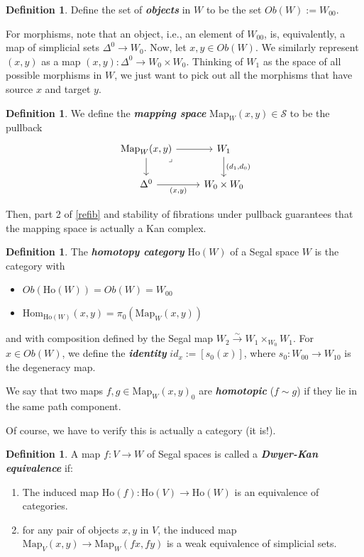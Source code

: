 \documentclass{article}
\newcommand{\textbi}[1]{\textbf{\textit{#1}}}
\newcommand{\cS}{\mathcal{S}}
\newcommand{\Ho}{\mathrm{Ho}}
\newcommand{\Hom}{\mathrm{Hom}}
\newcommand{\Map}{\mathrm{Map}}
\theoremstyle{definition}
\newtheorem{defin}[subsection]{Definition}
\begin{document}
\begin{defin}
    Define the set of \textbi{objects} in $W$ to be the set $Ob(W):=W_{00}$.
\end{defin}

For morphisms, note that an object, i.e., an element of $W_{00}$, is, equivalently, a map of simplicial sets $\Delta^0\to W_0$. Now, let $x,y \in Ob(W)$. We similarly represent $(x,y)$ as a map $(x,y):\Delta^0\to W_0\times W_0$. Thinking of $W_1$ as the space of all possible morphisms in $W$, we just want to pick out all the morphisms that have source $x$ and target $y$. 

\begin{defin}
    We define the \textbi{mapping space} $\Map_W(x,y)\in \cS$ to be the pullback 
\[\begin{tikzcd}
	{\Map_W(x,y)} & {W_1} \\
	{\Delta^0} & {W_0\times W_0}
	\arrow[from=1-1, to=1-2]
	\arrow["{(d_1, d_0)}", from=1-2, to=2-2]
	\arrow[from=1-1, to=2-1]
	\arrow["{(x,y)}"', from=2-1, to=2-2]
	\arrow["\lrcorner"{anchor=center, pos=0.125}, draw=none, from=1-1, to=2-2]
\end{tikzcd}\]
\end{defin}

Then, part 2 of \ref{refib} and stability of fibrations under pullback guarantees that the mapping space is actually a Kan complex. 

\begin{defin}
    The \textbi{homotopy category} $\Ho(W)$ of a Segal space $W$ is the category with 
    \begin{itemize}
        \item $Ob(\Ho(W))=Ob(W)=W_{00}$
        \item $\Hom_{\Ho(W)}(x,y)=\pi_0(\Map_W(x,y))$
    \end{itemize}
    and with composition defined by the Segal map $W_2\xrightarrow{\sim} W_1\times_{W_0}W_1$. For $x\in Ob(W)$, we define the \textbi{identity} $id_x:=[s_0(x)]$, where $s_0:W_{00}\to W_{10}$ is the degeneracy map.
    \par We say that two maps $f,g\in \Map_W(x,y)_0$ are \textbi{homotopic} ($f\sim g$) if they lie in the same path component. 
\end{defin}

Of course, we have to verify this is actually a category (it is!).

\begin{defin}
    A map $f: V \to W$ of Segal spaces is called a \textbi{Dwyer-Kan equivalence} if:
    \begin{enumerate}
        \item The induced map $\Ho(f):\Ho(V)\to \Ho(W)$ is an equivalence of categories.
        \item for any pair of objects $x,y$ in $V$, the induced map $\Map_{V}(x,y)\to \Map_{W}(fx, fy)$ is a weak equivalence of simplicial sets.
    \end{enumerate}
\end{defin}
\end{document}
